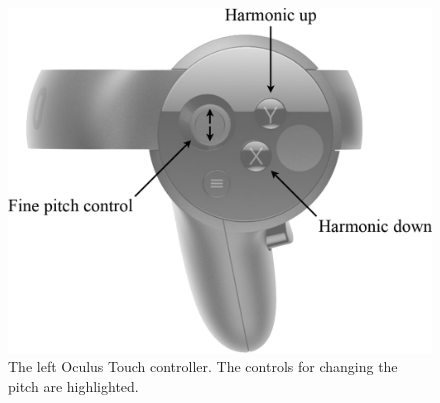 \documentclass[dvipsnames, pdftex]{article}
\begin{document}

\begin{figure}[ht]\includegraphics[width=1.0\columnwidth]{SMC 2020 paper template LaTeX/figures/controller.png}
\centering
  \caption{The left Oculus Touch controller. The controls for changing the pitch are highlighted. \label{fig:oculusController}}
\end{figure}
\end{document}
